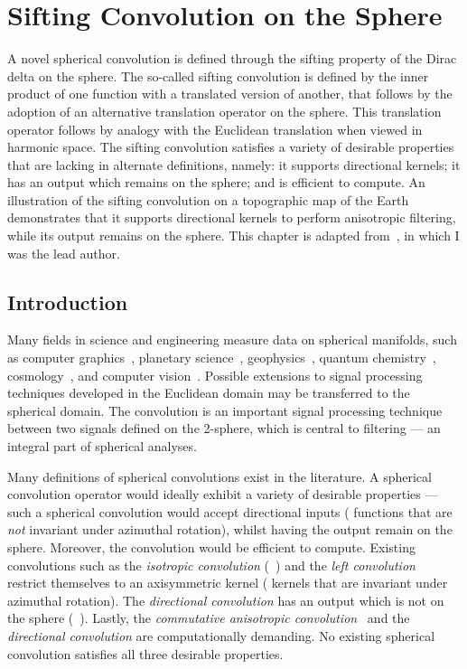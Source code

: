 \chapter{Sifting Convolution on the Sphere}\label{sec:chapter3}

A novel spherical convolution is defined through the sifting property of the Dirac delta on the sphere.
The so-called sifting convolution is defined by the inner product of one function with a translated version of another, that follows by the adoption of an alternative translation operator on the sphere.
This translation operator follows by analogy with the Euclidean translation when viewed in harmonic space.
The sifting convolution satisfies a variety of desirable properties that are lacking in alternate definitions, namely: it supports directional kernels; it has an output which remains on the sphere; and is efficient to compute.
An illustration of the sifting convolution on a topographic map of the Earth demonstrates that it supports directional kernels to perform anisotropic filtering, while its output remains on the sphere.
This chapter is adapted from~\cite{Roddy2021}, in which I was the lead author.

\section{Introduction}

Many fields in science and engineering measure data on spherical manifolds, such as computer graphics~\cite{Ramamoorthi2004}, planetary science~\cite{Turcotte1981}, geophysics~\cite{Simons2006}, quantum chemistry~\cite{Choi1999}, cosmology~\cite{Bennett1996}, and computer vision~\cite{Cohen2018,Esteves2020,Cobb2021}.
Possible extensions to signal processing techniques developed in the Euclidean domain may be transferred to the spherical domain.
The convolution is an important signal processing technique between two signals defined on the 2-sphere, which is central to filtering --- an integral part of spherical analyses.

Many definitions of spherical convolutions exist in the literature.
A spherical convolution operator would ideally exhibit a variety of desirable properties --- such a spherical convolution would accept directional inputs (\ie{} functions that are \emph{not} invariant under azimuthal rotation), whilst having the output remain on the sphere.
Moreover, the convolution would be efficient to compute.
Existing convolutions such as the \emph{isotropic convolution} (\eg{}~\cite{McEwen2007,Wei2011,Kennedy2011}) and the \emph{left convolution}~\cite{Kennedy2011,Driscoll1994} restrict themselves to an axisymmetric kernel (\ie{} kernels that are invariant under azimuthal rotation).
The \emph{directional convolution} has an output which is not on the sphere (\eg{}~\cite{McEwen2007,Wandelt2001}).
Lastly, the \emph{commutative anisotropic convolution}~\cite{Sadeghi2012,Khalid2012} and the \emph{directional convolution} are computationally demanding.
No existing spherical convolution satisfies all three desirable properties.

